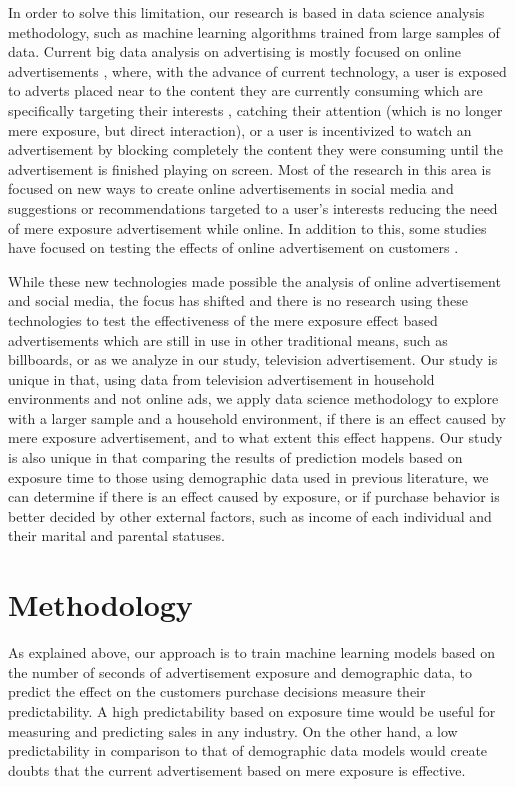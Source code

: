 \documentclass[review]{elsarticle}
\begin{document}
In order to solve this limitation, our research is based in data science analysis methodology, such as machine learning algorithms trained from large samples of data. Current big data analysis on advertising is mostly focused on online advertisements \cite[][]{wu, stitelman}, where, with the advance of current technology, a user is exposed to adverts placed near to the content they are currently consuming which are specifically targeting their interests \cite[][]{perlich,schwartz}, catching their attention (which is no longer mere exposure, but direct interaction), or a user is incentivized to watch an advertisement by blocking completely the content they were consuming until the advertisement is finished playing on screen. Most of the research in this area is focused on new ways to create online advertisements in social media \cite[][]{shareef-mb} and suggestions or recommendations targeted to a user's interests \cite[e.g.][]{jansen,zhang,kannan,choi} reducing the need of mere exposure advertisement while online. In addition to this, some studies have focused on testing the effects of online advertisement on customers \cite[][]{alawan,lee-j,shareef-mc}.

While these new technologies made possible the analysis of online advertisement and social media, the focus has shifted and there is no research using these technologies to test the effectiveness of the mere exposure effect based advertisements which are still in use in other traditional means, such as billboards, or as we analyze in our study, television advertisement. Our study is unique in that, using data from television advertisement in household environments and not online ads, we apply data science methodology to explore with a larger sample and a household environment, if there is an effect caused by mere exposure advertisement, and to what extent this effect happens. Our study is also unique in that comparing the results of prediction models based on exposure time to those using demographic data used in previous literature, we can determine if there is an effect caused by exposure, or if purchase behavior is better decided by other external factors, such as income of each individual and their marital and parental statuses.

\section{Methodology}
\label{method}

As explained above, our approach is to train machine learning models based on the number of seconds of advertisement exposure and demographic data, to predict the effect on the customers purchase decisions measure their predictability. A high predictability based on exposure time would be useful for measuring and predicting sales in any industry. On the other hand, a low predictability in comparison to that of demographic data models would create doubts that the current advertisement based on mere exposure is effective.
\end{document}
